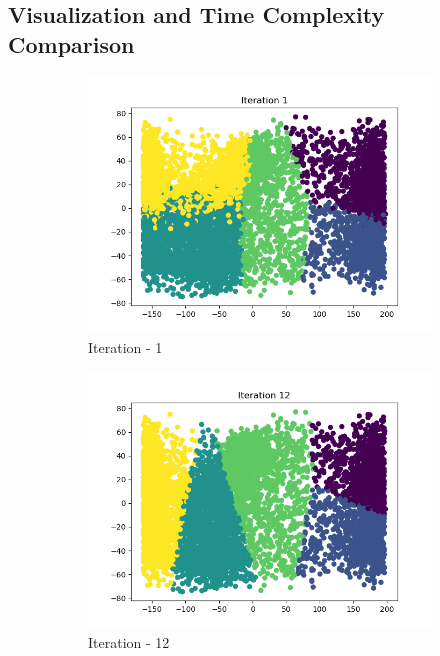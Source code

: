 \documentclass[12pt]{article}
\begin{document}
\subsection{Visualization and Time Complexity Comparison}
\begin{figure}[H]
	\centering
	\begin{subfigure}{0.45\linewidth}
		\includegraphics[scale=0.45]{km/1.png}
		\caption{Iteration - 1}
	\end{subfigure}%
	\begin{subfigure}{0.45\linewidth}
	\includegraphics[scale=0.45]{km/12.png}
	\caption{Iteration - 12}
	\end{subfigure}%
\hspace{5cm}
	\begin{subfigure}{0.45\linewidth}

\end{subfigure}
\end{figure}
\end{document}
